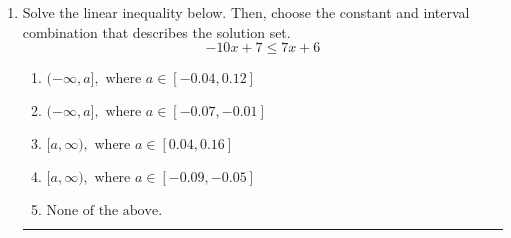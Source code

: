\documentclass[14pt]{extbook}
\newcommand{\litem}[1]{\item#1\hspace*{-1cm}\rule{\textwidth}{0.4pt}}
\begin{document}
\begin{enumerate}
{\begin{enumerate}[label=\Alph*.]
\end{enumerate} }
\litem{
Solve the linear inequality below. Then, choose the constant and interval combination that describes the solution set.\[ -10x + 7 \leq 7x + 6 \]\begin{enumerate}[label=\Alph*.]
\item \( (-\infty, a], \text{ where } a \in [-0.04, 0.12] \)
\item \( (-\infty, a], \text{ where } a \in [-0.07, -0.01] \)
\item \( [a, \infty), \text{ where } a \in [0.04, 0.16] \)
\item \( [a, \infty), \text{ where } a \in [-0.09, -0.05] \)
\item \( \text{None of the above}. \)

\end{enumerate} }
\end{enumerate}
\end{document}
